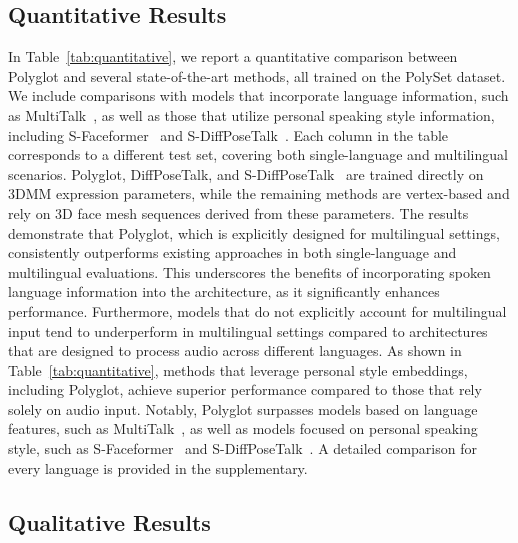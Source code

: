\documentclass[a4paper, 10pt, conference]{ieeeconf}      %
\begin{document}
\subsection{Quantitative Results}\label{sec:quanti}
In Table~\ref{tab:quantitative}, we report a quantitative comparison between Polyglot and several state-of-the-art methods, all trained on the PolySet dataset. We include comparisons with models that incorporate language information, such as MultiTalk~\cite{sungbin2024multitalkenhancing3dtalking}, as well as those that utilize personal speaking style information, including S-Faceformer~\cite{zhang2024personatalkbringattentionpersona} and S-DiffPoseTalk~\cite{sun2023diffposetalk}. Each column in the table corresponds to a different test set, covering both single-language and multilingual scenarios.
Polyglot, DiffPoseTalk, and S-DiffPoseTalk~\cite{sun2023diffposetalk} are trained directly on 3DMM expression parameters, while the remaining methods are vertex-based and rely on 3D face mesh sequences derived from these parameters. The results demonstrate that Polyglot, which is explicitly designed for multilingual settings, consistently outperforms existing approaches in both single-language and multilingual evaluations. This underscores the benefits of incorporating spoken language information into the architecture, as it significantly enhances performance.
Furthermore, models that do not explicitly account for multilingual input tend to underperform in multilingual settings compared to architectures that are designed to process audio across different languages. As shown in Table~\ref{tab:quantitative}, methods that leverage personal style embeddings, including Polyglot, achieve superior performance compared to those that rely solely on audio input. Notably, Polyglot surpasses models based on language features, such as MultiTalk~\cite{sungbin2024multitalkenhancing3dtalking}, as well as models focused on personal speaking style, such as S-Faceformer~\cite{zhang2024personatalkbringattentionpersona} and S-DiffPoseTalk~\cite{sun2023diffposetalk}. A detailed comparison for every language is provided in the supplementary. 

\subsection{Qualitative Results}
\label{sec:quali}
\end{document}
